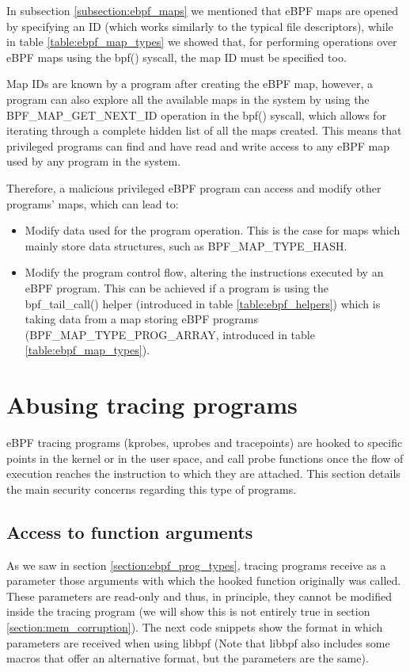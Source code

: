 \documentclass[12pt]{report} %
\begin{document}
In subsection \ref{subsection:ebpf_maps} we mentioned that eBPF maps are opened by specifying an ID (which works similarly to the typical file descriptors), while in table \ref{table:ebpf_map_types} we showed that, for performing operations over eBPF maps using the bpf() syscall, the map ID must be specified too. 

Map IDs are known by a program after creating the eBPF map, however, a program can also explore all the available maps in the system by using the BPF\_MAP\_GET\_NEXT\_ID operation in the bpf() syscall, which allows for iterating through a complete hidden list of all the maps created. This means that privileged programs can find and have read and write access to any eBPF map used by any program in the system.

Therefore, a malicious privileged eBPF program can access and modify other programs' maps, which can lead to:
\begin{itemize}
\item Modify data used for the program operation. This is the case for maps which mainly store data structures, such as BPF\_MAP\_TYPE\_HASH.
\item Modify the program control flow, altering the instructions executed by an eBPF program. This can be achieved if a program is using the bpf\_tail\_call() helper (introduced in table \ref{table:ebpf_helpers}) which is taking data from a map storing eBPF programs (BPF\_MAP\_TYPE\_PROG\_ARRAY, introduced in table \ref{table:ebpf_map_types}).
\end{itemize}


\section{Abusing tracing programs}
eBPF tracing programs (kprobes, uprobes and tracepoints) are hooked to specific points in the kernel or in the user space, and call probe functions once the flow of execution reaches the instruction to which they are attached. This section details the main security concerns regarding this type of programs.

\subsection{Access to function arguments}
As we saw in section \ref{section:ebpf_prog_types}, tracing programs receive as a parameter those arguments with which the hooked function originally was called. These parameters are read-only and thus, in principle, they cannot be modified inside the tracing program (we will show this is not entirely true in section \ref{section:mem_corruption}). The next code snippets show the format in which parameters are received when using libbpf (Note that libbpf also includes  some macros that offer an alternative format, but the parameters are the same).
\end{document}
